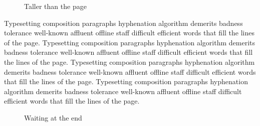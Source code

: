 \documentclass[12pt]{report}
\begin{document}
\begin{figure}[tbp]
\vspace{700pt}
\caption{Taller than the page}
\end{figure}

Typesetting composition paragraphs hyphenation algorithm demerits badness tolerance well-known affluent offline staff difficult efficient words that fill the lines of the page. Typesetting composition paragraphs hyphenation algorithm demerits badness tolerance well-known affluent offline staff difficult efficient words that fill the lines of the page. Typesetting composition paragraphs hyphenation algorithm demerits badness tolerance well-known affluent offline staff difficult efficient words that fill the lines of the page. Typesetting composition paragraphs hyphenation algorithm demerits badness tolerance well-known affluent offline staff difficult efficient words that fill the lines of the page.

\begin{table}[!t]
\vspace{40pt}
\caption{Last}
\end{table}
\begin{figure}[b]
\vspace{30pt}
\caption{Waiting at the end}
\end{figure}
\end{document}
